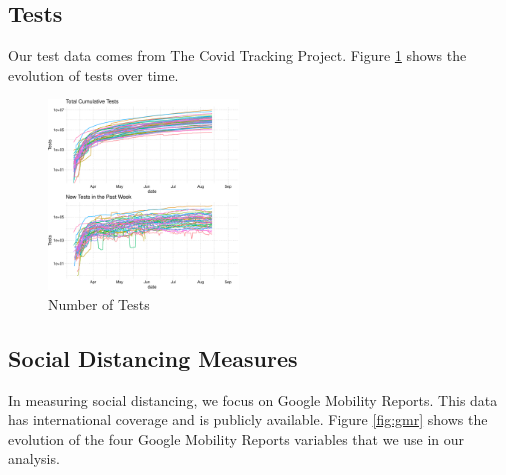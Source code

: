 \documentclass[11pt,reqno,letter]{amsart}
\theoremstyle{definition}
\begin{document}
\subsection{Tests}

Our test data comes from The Covid Tracking Project. Figure
\ref{fig:test} shows the evolution of tests over time.

\begin{figure}[!ht]\caption{Number of Tests \label{fig:test}}
  \centering
  \begin{minipage}{\textwidth}
    \centering
    \includegraphics[width=0.45\textwidth]{tables_and_figures/test}
  \end{minipage}
\end{figure}

\FloatBarrier

\subsection{Social Distancing Measures}

In measuring social distancing, we focus on Google Mobility
Reports. This data has international coverage and is publicly
available. Figure \ref{fig:gmr} shows the evolution of the four Google
Mobility Reports variables that we use in our analysis.
\end{document}
